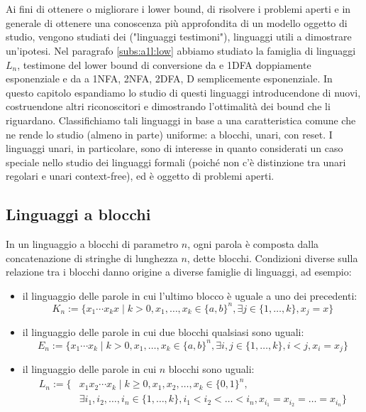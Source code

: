 \chapter{}\label{cha:wit}
Ai fini di ottenere o migliorare i lower bound, di risolvere i problemi aperti e in generale di ottenere una conoscenza più approfondita di un modello oggetto di studio, vengono studiati dei  ("linguaggi testimoni"), linguaggi utili a dimostrare un'ipotesi. Nel paragrafo \ref{subs:a1l:low} abbiamo studiato la famiglia di linguaggi $L_n$, testimone del lower bound di conversione da  e 1DFA doppiamente esponenziale e da  a 1NFA, 2NFA, 2DFA, D semplicemente esponenziale. In questo capitolo espandiamo lo studio di questi linguaggi introducendone di nuovi, costruendone altri riconoscitori e dimostrando l'ottimalità dei bound che li riguardano. Classifichiamo tali linguaggi in base a una caratteristica comune che ne rende lo studio (almeno in parte) uniforme: a blocchi, unari, con reset. I linguaggi unari, in particolare, sono di interesse in quanto considerati un caso speciale nello studio dei linguaggi formali (poiché non c'è distinzione tra unari regolari e unari context-free), ed è oggetto di problemi aperti.



\section{Linguaggi a blocchi}\label{sec:wit:blk}
In un linguaggio a blocchi di parametro $n$, ogni parola è composta dalla concatenazione di stringhe di lunghezza $n$, dette blocchi. Condizioni diverse sulla relazione tra i blocchi danno origine a diverse famiglie di linguaggi, ad esempio:
\begin{itemize}
	\item il linguaggio delle parole in cui l'ultimo blocco è uguale a uno dei precedenti:
	      \begin{equation*}
		      K_n := \{ x_1\cdots x_kx \mid k>0, x_1,\dots,x_k\in\{a,b\}^n, \exists j\in\{1,\dots,k\},x_j=x\}
	      \end{equation*}
	\item il linguaggio delle parole in cui due blocchi qualsiasi sono uguali:
	      \begin{equation*}
		      E_n := \{x_1\cdots x_k \mid k>0, x_1,\dots,x_k\in\{a,b\}^n,\exists i,j\in\{1,\dots,k\},i<j,x_i=x_j\}
	      \end{equation*}
	\item il linguaggio delle parole in cui $n$ blocchi sono uguali:
	      \begin{align*}
		      L_n := \{ & x_1x_2\cdots x_k\mid k\geq0, x_1,x_2,\dots,x_k\in\{0,1\}^n,                                  \\
		                & \exists i_1,i_2,\dots,i_n\in\{1,\dots,k\},i_1<i_2<\dots<i_n, x_{i_1}=x_{i_2}=\dots=x_{i_n}\}
	      \end{align*}
\end{itemize}

